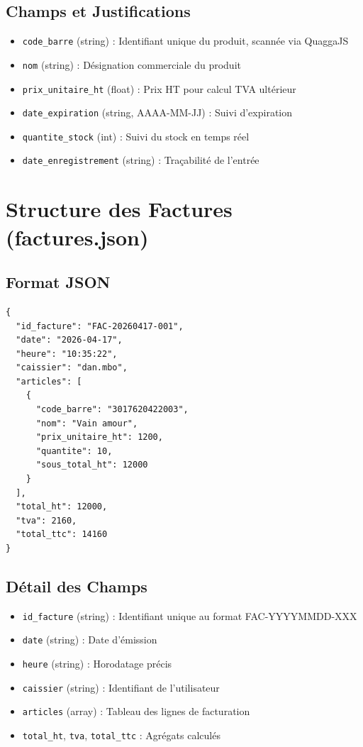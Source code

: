\documentclass[12pt,a4paper]{report}
\begin{document}
\subsection{Champs et Justifications}

\begin{itemize}
    \item \texttt{code\_barre} (string) : Identifiant unique du produit, scannée via QuaggaJS
    \item \texttt{nom} (string) : Désignation commerciale du produit
    \item \texttt{prix\_unitaire\_ht} (float) : Prix HT pour calcul TVA ultérieur
    \item \texttt{date\_expiration} (string, AAAA-MM-JJ) : Suivi d'expiration
    \item \texttt{quantite\_stock} (int) : Suivi du stock en temps réel
    \item \texttt{date\_enregistrement} (string) : Traçabilité de l'entrée
\end{itemize}

\section{Structure des Factures (factures.json)}

\subsection{Format JSON}

\begin{lstlisting}
{
  "id_facture": "FAC-20260417-001",
  "date": "2026-04-17",
  "heure": "10:35:22",
  "caissier": "dan.mbo",
  "articles": [
    {
      "code_barre": "3017620422003",
      "nom": "Vain amour",
      "prix_unitaire_ht": 1200,
      "quantite": 10,
      "sous_total_ht": 12000
    }
  ],
  "total_ht": 12000,
  "tva": 2160,
  "total_ttc": 14160
}
\end{lstlisting}

\subsection{Détail des Champs}

\begin{itemize}
    \item \texttt{id\_facture} (string) : Identifiant unique au format FAC-YYYYMMDD-XXX
    \item \texttt{date} (string) : Date d'émission
    \item \texttt{heure} (string) : Horodatage précis
    \item \texttt{caissier} (string) : Identifiant de l'utilisateur
    \item \texttt{articles} (array) : Tableau des lignes de facturation
    \item \texttt{total\_ht}, \texttt{tva}, \texttt{total\_ttc} : Agrégats calculés
\end{itemize}
\end{document}
